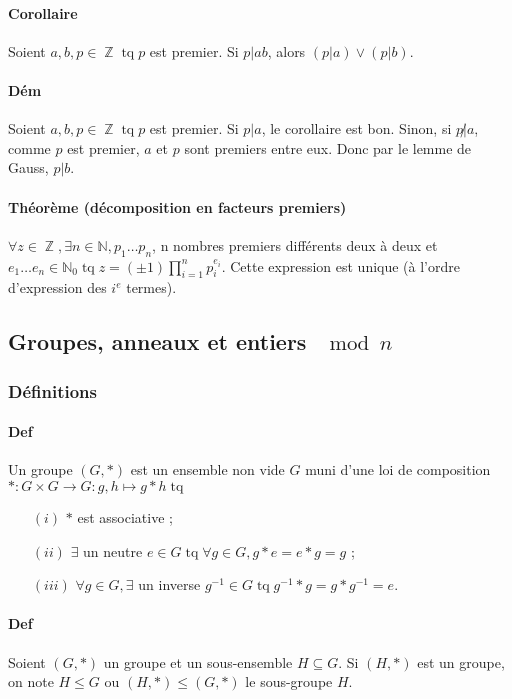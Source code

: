 \documentclass{article}
\DeclareMathOperator{\tq}{\text{ tq }}
\DeclareMathOperator{\Z}{\mathbb Z}
\begin{document}
			\paragraph{Corollaire} Soient $a, b, p \in \Z \tq p$ est premier. Si $p|ab$, alors $(p|a) \lor (p|b)$.

			\paragraph{Dém} Soient $a, b, p \in \Z \tq p$ est premier. Si $p|a$, le corollaire est bon. Sinon, si $p\not|a$, comme $p$
			est premier, $a$ et $p$ sont premiers entre eux. Donc par le lemme de Gauss, $p|b$.

			\paragraph{Théorème (décomposition en facteurs premiers)} $\forall z \in \Z, \exists n \in \mathbb N, p_1 \ldots p_n$, n nombres
			premiers différents deux à deux et $e_1 \ldots e_n \in \mathbb N_0 \tq z = (\pm 1)\prod_{i=1}^np_i^{e_i}$. Cette expression est unique
			(à l'ordre d'expression des $i^e$ termes).

		\subsection{Groupes, anneaux et entiers $\mod n$}

			\subsubsection{Définitions}

			\paragraph{Def} Un groupe $(G, *)$ est un ensemble non vide $G$ muni d'une loi de composition $* : G \times G \to G : g, h \mapsto g*h \tq$

			\begin{itemize}
				\item[$(i)$] $*$ est associative ;
				\item[$(ii)$] $\exists$ un neutre $e \in G \tq \forall g \in G, g*e = e*g = g$ ;
				\item[$(iii)$] $\forall g \in G, \exists$ un inverse $g^{-1} \in G \tq g^{-1} * g = g * g^{-1} = e$.
			\end{itemize}

			\paragraph{Def} Soient $(G, *)$ un groupe et un sous-ensemble $H \subseteq G$. Si $(H, *)$ est un groupe, on note $H \leq G$
			ou $(H, *) \leq (G, *)$ le sous-groupe $H$.
\end{document}
